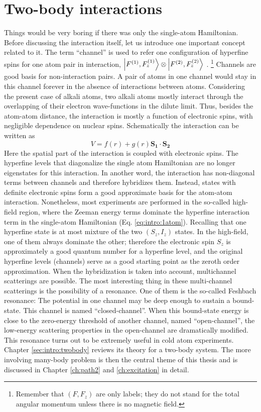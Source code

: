 \section{Two-body interactions}
Things would be very boring if there was only the single-atom Hamiltonian.  Before discussing the interaction itself, let us introduce one important concept related to it.    The term ``channel'' is used to refer one  configuration of hyperfine spins for one atom pair in interaction, $\left|F^{(1)},F_{z}^{(1)}\right>\otimes\left|F^{(2)},F_{z}^{(2)}\right>$ . \footnote{Remember that $(F,F_{z})$ are only labels; they do not stand for the total angular momentum unless there is no magnetic field.\label{foot:intro:f}}    Channels are good basis for non-interaction pairs.  A pair of atoms in one channel would stay in this channel  forever in the absence of  interactions between atoms.  Considering the present case of alkali atoms, two alkali atoms mostly interact  through the overlapping of their electron wave-functions in the dilute limit.  Thus, besides the atom-atom distance, the interaction is mostly a function of electronic spins, with negligible dependence on nuclear spins.  Schematically the interaction can be written as 
\begin{equation}\label{eq:intro:two}
V=f(r)+g(r)\mathbf{S_{1}}\cdot\mathbf{S_{2}}
\end{equation}
Here the spatial part of the interaction is coupled with electronic spins. The hyperfine levels that diagonalize the single atom Hamiltonian are no longer eigenstates for this interaction.  In another word, the interaction has non-diagonal terms between channels and therefore hybridizes them. Instead, states with definite electronic spins form a good approximate basis for the atom-atom interaction.  Nonetheless, most experiments are performed in the so-called high-field region,  where the Zeeman energy terms dominate the hyperfine interaction term in the single-atom Hamiltonian (Eq. \ref{eq:intro:1atom}).   Recalling that one hyperfine state is at most mixture of the two $(S_{z}, I_{z})$ states.  In the high-field, one of them always dominate the other; therefore               the electronic spin $S_z$ is approximately a good quantum number for a hyperfine level, and the original hyperfine levels (channels) serve as a good starting point as the zeroth order approximation.  When the hybridization is taken into account, multichannel scatterings are possible.  The most interesting thing in these multi-channel scatterings is the possibility of a resonance.  One of them is the so-called Feshbach resonance:  The potential in one channel may be deep enough to sustain a bound-state. This channel is named ``closed-channel''. When this bound-state energy is close to the zero-energy threshold of another channel, named ``open-channel'', the low-energy scattering properties in the open-channel are dramatically modified.  This resonance turns out to be extremely useful in   cold atom experiments.  Chapter \ref{sec:intro:twobody} reviews its theory for  a two-body system. The more involving many-body problem is then the central theme of this thesis and is discussed in Chapter \ref{ch:path2} and \ref{ch:excitation} in detail. 

